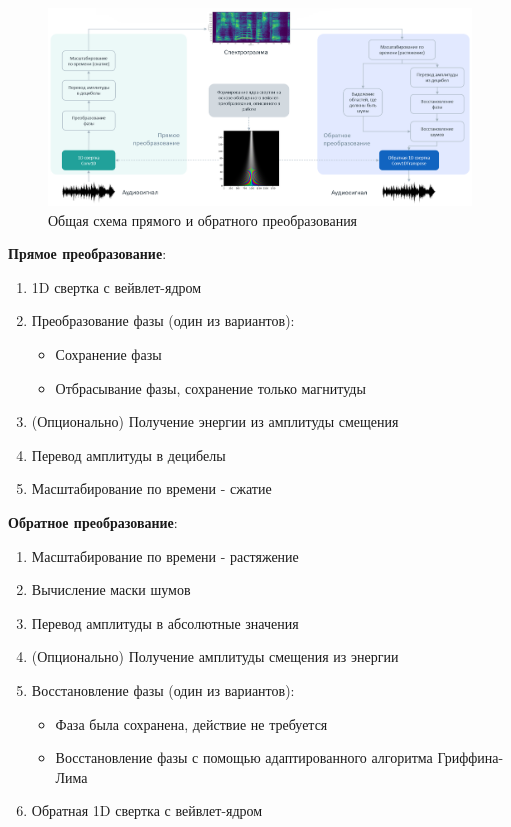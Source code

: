 \clearpage

\begin{figure}
  \centering
  \includegraphics[width=0.9\linewidth]{figures/algorithm_overview}
  \caption{Общая схема прямого и обратного преобразования}
  \label{fig:algorithm_overview}
\end{figure}

\textbf{Прямое преобразование}:
\begin{enumerate}[1.]
  \item 1D свертка с вейвлет-ядром
  \item Преобразование фазы (один из вариантов):
    \begin{itemize}
      \item Сохранение фазы
      \item Отбрасывание фазы, сохранение только магнитуды
    \end{itemize}
  \item (Опционально) Получение энергии из амплитуды смещения
  \item Перевод амплитуды в децибелы
  \item Масштабирование по времени - сжатие
\end{enumerate}

\textbf{Обратное преобразование}:
\begin{enumerate}[1.]
  \item Масштабирование по времени - растяжение
  \item Вычисление маски шумов
  \item Перевод амплитуды в абсолютные значения
  \item (Опционально) Получение амплитуды смещения из энергии
  \item Восстановление фазы (один из вариантов):
    \begin{itemize}
      \item Фаза была сохранена, действие не требуется
      \item Восстановление фазы с помощью адаптированного алгоритма Гриффина-Лима
    \end{itemize}
  \item Обратная 1D свертка с вейвлет-ядром
\end{enumerate}


